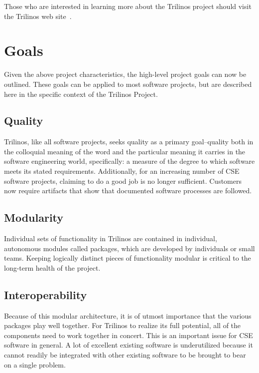 \documentclass[12pt,relax]{article}
\begin{document}
Those who are interested in learning more about the Trilinos project should
visit the Trilinos web site~\cite{Trilinos-home-page}.


\section{Goals}
\label{Section:Goals}

Given the above project characteristics, the high-level project goals can now
be outlined.  These goals can be applied to most software projects,
but are described here in the specific context of the Trilinos Project.

\subsection{Quality}
Trilinos, like all software projects, seeks quality as a primary goal--quality
both in the colloquial meaning of the word and the particular meaning it
carries in the software engineering world, specifically:  a measure of the
degree to which software meets its stated requirements.  Additionally, for an 
increasing number of CSE software projects, claiming to do a good job is no 
longer sufficient.  Customers now require artifacts that show that documented 
software processes are followed.

\subsection{Modularity}
Individual sets of functionality in Trilinos are contained in individual,
autonomous modules called packages, which are developed by individuals or small
teams.  Keeping logically distinct pieces of functionality modular is critical
to the long-term health of the project.  

\subsection{Interoperability}
Because of this modular architecture, it is of utmost importance that the
various packages play well together.  For Trilinos to realize its full
potential, all of the components need to work together in concert.  This is an
important issue for CSE software in general.  A lot of excellent existing
software is underutilized because it cannot readily be integrated with other
existing software to be brought to bear on a single problem.
\end{document}
